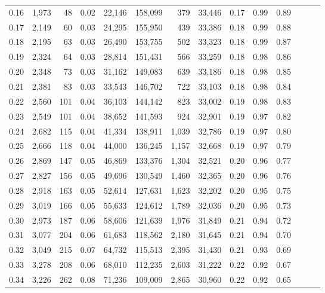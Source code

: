 \begin{tabular}{rrrrrrrrrrrrrr}
0.16 &  1,973 &   48 &  0.02 &   22,146 &  158,099 &     379 &  33,446 &  0.17 &  0.99 &      0.89 \\
0.17 &  2,149 &   60 &  0.03 &   24,295 &  155,950 &     439 &  33,386 &  0.18 &  0.99 &      0.88 \\
0.18 &  2,195 &   63 &  0.03 &   26,490 &  153,755 &     502 &  33,323 &  0.18 &  0.99 &      0.87 \\
0.19 &  2,324 &   64 &  0.03 &   28,814 &  151,431 &     566 &  33,259 &  0.18 &  0.98 &      0.86 \\
0.20 &  2,348 &   73 &  0.03 &   31,162 &  149,083 &     639 &  33,186 &  0.18 &  0.98 &      0.85 \\
0.21 &  2,381 &   83 &  0.03 &   33,543 &  146,702 &     722 &  33,103 &  0.18 &  0.98 &      0.84 \\
0.22 &  2,560 &  101 &  0.04 &   36,103 &  144,142 &     823 &  33,002 &  0.19 &  0.98 &      0.83 \\
0.23 &  2,549 &  101 &  0.04 &   38,652 &  141,593 &     924 &  32,901 &  0.19 &  0.97 &      0.82 \\
0.24 &  2,682 &  115 &  0.04 &   41,334 &  138,911 &   1,039 &  32,786 &  0.19 &  0.97 &      0.80 \\
0.25 &  2,666 &  118 &  0.04 &   44,000 &  136,245 &   1,157 &  32,668 &  0.19 &  0.97 &      0.79 \\
0.26 &  2,869 &  147 &  0.05 &   46,869 &  133,376 &   1,304 &  32,521 &  0.20 &  0.96 &      0.77 \\
0.27 &  2,827 &  156 &  0.05 &   49,696 &  130,549 &   1,460 &  32,365 &  0.20 &  0.96 &      0.76 \\
0.28 &  2,918 &  163 &  0.05 &   52,614 &  127,631 &   1,623 &  32,202 &  0.20 &  0.95 &      0.75 \\
0.29 &  3,019 &  166 &  0.05 &   55,633 &  124,612 &   1,789 &  32,036 &  0.20 &  0.95 &      0.73 \\
0.30 &  2,973 &  187 &  0.06 &   58,606 &  121,639 &   1,976 &  31,849 &  0.21 &  0.94 &      0.72 \\
0.31 &  3,077 &  204 &  0.06 &   61,683 &  118,562 &   2,180 &  31,645 &  0.21 &  0.94 &      0.70 \\
0.32 &  3,049 &  215 &  0.07 &   64,732 &  115,513 &   2,395 &  31,430 &  0.21 &  0.93 &      0.69 \\
0.33 &  3,278 &  208 &  0.06 &   68,010 &  112,235 &   2,603 &  31,222 &  0.22 &  0.92 &      0.67 \\
0.34 &  3,226 &  262 &  0.08 &   71,236 &  109,009 &   2,865 &  30,960 &  0.22 &  0.92 &      0.65 \\

\end{tabular}

